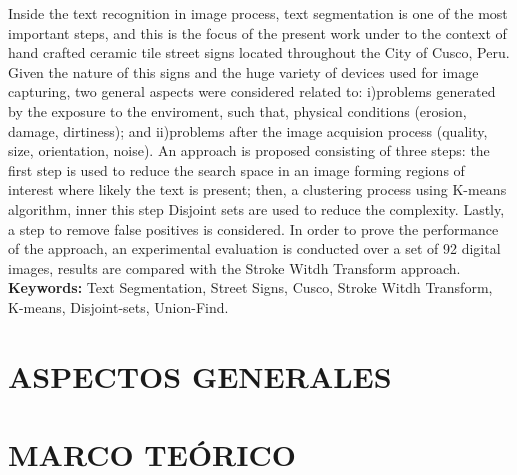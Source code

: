 \documentclass[12pt,oneside,a4paper]{book}
\theoremstyle{definition}
\begin{document}
Inside the text recognition in image process, text segmentation is one of the
most important steps, and this is the focus of the present work under to the 
context of hand crafted ceramic tile street signs located throughout the City of
Cusco, Peru. Given the nature of this signs and the huge variety of devices used
for image capturing, two general aspects were considered related to: i)problems
generated by the exposure to the enviroment, such that, physical conditions (erosion,
damage, dirtiness); and ii)problems after the image acquision process (quality, 
size, orientation, noise). An approach is proposed consisting of three steps: the
first step is used to reduce the search space in an image forming regions of interest
where likely the text is present; then, a clustering process using K-means 
algorithm, inner this step Disjoint sets are used to reduce the complexity. Lastly,
a step to remove false positives is considered. In order to prove the performance
of the approach, an experimental evaluation is conducted over a set of 92 
digital images, results are compared with the Stroke Witdh Transform approach.
\\

\noindent \textbf{Keywords:} Text Segmentation, Street Signs, Cusco, Stroke Witdh Transform, 
K-means, Disjoint-sets, Union-Find.

\tableofcontents    %

\renewcommand\listtablename{ÍNDICE DE TABLAS}
\renewcommand\listfigurename{ÍNDICE DE FIGURAS}
\listoftables
\listoffigures

\mainmatter

\fancyhead[RE,LO]{\thesection}

\onehalfspacing            %


\part{ASPECTOS GENERALES}


\part{MARCO TEÓRICO}



\end{document}
